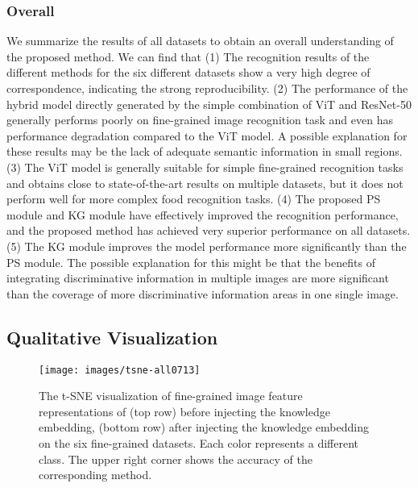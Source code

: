 \documentclass[5p,twocolumn]{elsarticle}
\begin{document}
\subsubsection{\textbf{Overall}}
We summarize the results of all datasets to obtain an overall understanding of the proposed method. We can find that 
(1) The recognition results of the different methods for the six different datasets show a very high degree of correspondence, indicating the strong reproducibility. 
(2) The performance of the hybrid model directly generated by the simple combination of ViT and ResNet-50 generally performs poorly on fine-grained image recognition task and even has performance degradation compared to the ViT model. A possible explanation for these results may be the lack of adequate semantic information in small regions. (3) The ViT model is generally suitable for simple fine-grained recognition tasks and obtains close to state-of-the-art results on multiple datasets, but it does not perform well for more complex food recognition tasks. (4) The proposed PS module and KG module have effectively improved the recognition performance, and the proposed method has achieved very superior performance on all datasets. (5) The KG module improves the model performance more significantly than the PS module. The possible explanation for this might be that the benefits of integrating discriminative information in multiple images are more significant than the coverage of more discriminative information areas in one single image.



\subsection{Qualitative Visualization}

\begin{figure*}[]
\centering
 \texttt{[image: images/tsne-all0713]}
  \caption{The t-SNE visualization of fine-grained image feature representations of (top row) before injecting the knowledge embedding, (bottom row) after injecting the knowledge embedding on the six fine-grained datasets. Each color represents a different class. The upper right corner shows the accuracy of the corresponding method.}
  \label{fig:tsne}
\end{figure*}
\end{document}
